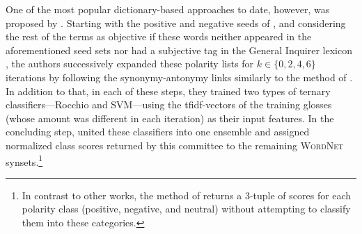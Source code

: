 
One of the most popular dictionary-based approaches to date, however,
was proposed by \citet{Esuli:06c}.  Starting with the positive and
negative seeds of \citet{Turney:03}, and considering the rest of the
terms as objective if these words neither appeared in the aforementioned
seed sets nor had a subjective tag in the General Inquirer lexicon
\cite{Stone:66}, the authors successively expanded these polarity
lists for $k \in \{0, 2, 4, 6\}$ iterations by following the
synonymy-antonymy links similarly to the method of \citet{Hu:04}.  In
addition to that, in each of these steps, they trained two types of
ternary classifiers---Rocchio and SVM---using the tfidf-vectors of the
training glosses (whose amount was different in each iteration) as
their input features.  In the concluding step, \citet{Esuli:06c}
united these classifiers into one ensemble and assigned normalized
class scores returned by this committee to the remaining
\textsc{WordNet} synsets.\footnote{In contrast to other works, the
  method of \citet{Esuli:06c} returns a 3-tuple of scores for each
  polarity class (positive, negative, and neutral) without attempting
  to classify them into these categories.}

